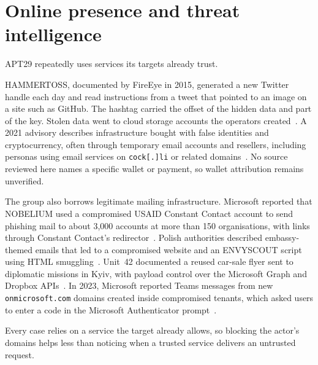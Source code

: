 \section{Online presence and threat intelligence}
\label{sec:online}

APT29 repeatedly uses services its targets already trust.

HAMMERTOSS, documented by FireEye in 2015, generated a new Twitter handle each day and read instructions from a tweet that pointed to an image on a site such as GitHub. The hashtag carried the offset of the hidden data and part of the key. Stolen data went to cloud storage accounts the operators created~\cite{fireeye-hammertoss}. A 2021 advisory describes infrastructure bought with false identities and cryptocurrency, often through temporary email accounts and resellers, including personas using email services on \texttt{cock[.]li} or related domains~\cite{aa21-116a}. No source reviewed here names a specific wallet or payment, so wallet attribution remains unverified.

The group also borrows legitimate mailing infrastructure. Microsoft reported that NOBELIUM used a compromised USAID Constant Contact account to send phishing mail to about 3,000 accounts at more than 150 organisations, with links through Constant Contact's redirector~\cite{ms-nobelium}. Polish authorities described embassy-themed emails that led to a compromised website and an ENVYSCOUT script using HTML smuggling~\cite{skw-certpolska}. Unit~42 documented a reused car-sale flyer sent to diplomatic missions in Kyiv, with payload control over the Microsoft Graph and Dropbox APIs~\cite{unit42}. In 2023, Microsoft reported Teams messages from new \texttt{onmicrosoft.com} domains created inside compromised tenants, which asked users to enter a code in the Microsoft Authenticator prompt~\cite{ms-teams}.

Every case relies on a service the target already allows, so blocking the actor's domains helps less than noticing when a trusted service delivers an untrusted request.
